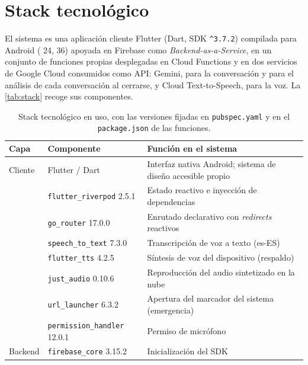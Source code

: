 
\section{Stack tecnológico}
\label{sec:stack}

El sistema es una aplicación cliente Flutter (Dart, SDK \texttt{\textasciicircum 3.7.2}) compilada para Android ( 24,  36) apoyada en Firebase como \emph{Backend-as-a-Service}, en un conjunto de funciones propias desplegadas en Cloud Functions y en dos servicios de Google Cloud consumidos como API: Gemini, para la conversación y para el análisis de cada conversación al cerrarse, y Cloud Text-to-Speech, para la voz. La \autoref{tab:stack} recoge sus componentes.

\begin{table}[htbp]
    \centering
    \caption{Stack tecnológico en uso, con las versiones fijadas en \texttt{pubspec.yaml} y en el \texttt{package.json} de las funciones.}
    \label{tab:stack}
    \begin{tabularx}{\textwidth}{@{}l l >{\RaggedRight\arraybackslash}X@{}}
        \toprule
        \textbf{Capa} & \textbf{Componente} & \textbf{Función en el sistema} \\
        \midrule
        Cliente     & Flutter / Dart               & Interfaz nativa Android; sistema de diseño accesible propio \\
                    & \texttt{flutter\_riverpod} 2.5.1 & Estado reactivo e inyección de dependencias \\
                    & \texttt{go\_router} 17.0.0   & Enrutado declarativo con \emph{redirects} reactivos \\
                    & \texttt{speech\_to\_text} 7.3.0 & Transcripción de voz a texto (es-ES) \\
                    & \texttt{flutter\_tts} 4.2.5  & Síntesis de voz del dispositivo (respaldo) \\
                    & \texttt{just\_audio} 0.10.6  & Reproducción del audio sintetizado en la nube \\
                    & \texttt{url\_launcher} 6.3.2 & Apertura del marcador del sistema (emergencia) \\
                    & \texttt{permission\_handler} 12.0.1 & Permiso de micrófono \\
        \midrule
        Backend     & \texttt{firebase\_core} 3.15.2 & Inicialización del SDK \\

\end{tabularx}
\end{table}
